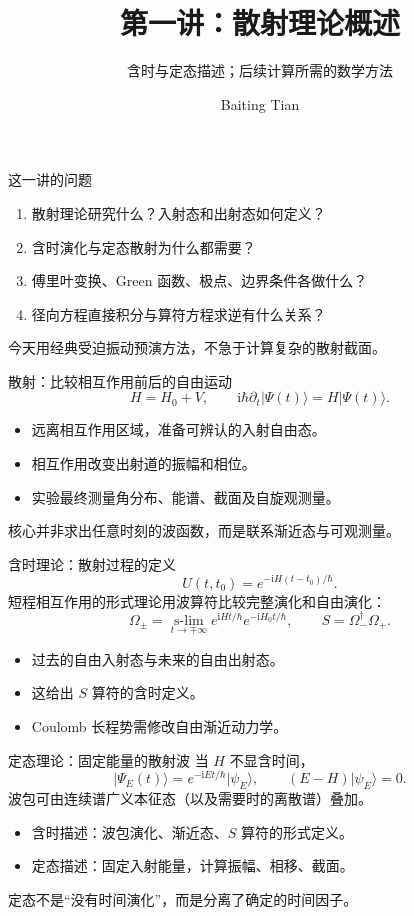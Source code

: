 \documentclass[aspectratio=169,11pt]{beamer}
\title{第一讲：散射理论概述}
\subtitle{含时与定态描述；后续计算所需的数学方法}
\author{Baiting Tian}
\date{}
\newcommand{\ii}{\mathrm i}
\newcommand{\ket}[1]{\lvert #1\rangle}
\begin{document}
\begin{frame}\titlepage\end{frame}
\begin{frame}{这一讲的问题}
\begin{enumerate}
\item 散射理论研究什么？入射态和出射态如何定义？
\item 含时演化与定态散射为什么都需要？
\item 傅里叶变换、Green 函数、极点、边界条件各做什么？
\item 径向方程直接积分与算符方程求逆有什么关系？
\end{enumerate}
今天用经典受迫振动预演方法，不急于计算复杂的散射截面。
\end{frame}
\begin{frame}{散射：比较相互作用前后的自由运动}
\[
H=H_0+V,\qquad \ii\hbar\partial_t\ket{\Psi(t)}=H\ket{\Psi(t)}.
\]
\begin{itemize}
\item 远离相互作用区域，准备可辨认的入射自由态。
\item 相互作用改变出射道的振幅和相位。
\item 实验最终测量角分布、能谱、截面及自旋观测量。
\end{itemize}
核心并非求出任意时刻的波函数，而是联系渐近态与可观测量。
\end{frame}
\begin{frame}{含时理论：散射过程的定义}
\[
U(t,t_0)=e^{-\ii H(t-t_0)/\hbar}.
\]
短程相互作用的形式理论用波算符比较完整演化和自由演化：
\[
\Omega_\pm=\operatorname*{s-lim}_{t\to\mp\infty}
e^{\ii Ht/\hbar}e^{-\ii H_0t/\hbar},
\qquad S=\Omega_-^\dagger\Omega_+.
\]
\begin{itemize}
\item 过去的自由入射态与未来的自由出射态。
\item 这给出 $S$ 算符的含时定义。
\item Coulomb 长程势需修改自由渐近动力学。
\end{itemize}
\end{frame}
\begin{frame}{定态理论：固定能量的散射波}
当 $H$ 不显含时间，
\[
\ket{\Psi_E(t)}=e^{-\ii Et/\hbar}\ket{\psi_E},
\qquad (E-H)\ket{\psi_E}=0.
\]
波包可由连续谱广义本征态（以及需要时的离散谱）叠加。
\begin{itemize}
\item 含时描述：波包演化、渐近态、$S$ 算符的形式定义。
\item 定态描述：固定入射能量，计算振幅、相移、截面。
\end{itemize}
定态不是“没有时间演化”，而是分离了确定的时间因子。
\end{frame}
\end{document}
